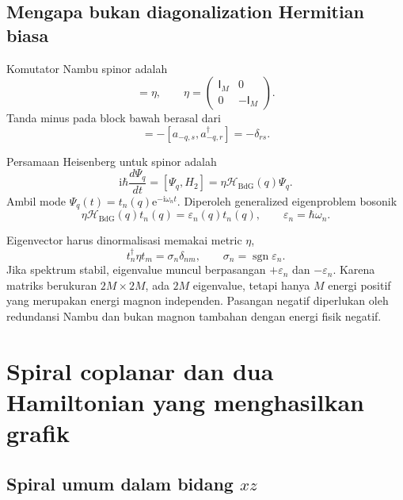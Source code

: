 \documentclass[11pt,a4paper]{article}
\newcommand{\ii}{\mathrm{i}}
\newcommand{\ee}{\mathrm{e}}
\newcommand{\mH}{\mathcal H}
\newcommand{\identity}{\mathsf I}
\begin{document}
\subsection{Mengapa bukan diagonalization Hermitian biasa}

Komutator Nambu spinor adalah
\begin{equation}
[\Psi_q,\Psi_q^\dagger]=
\eta,
\qquad
\eta=
\begin{pmatrix}
\identity_M&0\\0&-\identity_M
\end{pmatrix}.
\label{eq:bosonic-metric}
\end{equation}
Tanda minus pada block bawah berasal dari
\begin{equation}
[a_{-q,r}^\dagger,a_{-q,s}]=-[a_{-q,s},a_{-q,r}^\dagger]=-\delta_{rs}.
\end{equation}

Persamaan Heisenberg untuk spinor adalah
\begin{equation}
\ii\hbar\frac{d\Psi_q}{dt}
=[\Psi_q,H_2]
=\eta\mH_{\mathrm{BdG}}(q)\Psi_q.
\end{equation}
Ambil mode $\Psi_q(t)=t_n(q)\ee^{-\ii\omega_n t}$. Diperoleh generalized eigenproblem bosonik
\begin{equation}
\boxed{
\eta\mH_{\mathrm{BdG}}(q)t_n(q)
=\varepsilon_n(q)t_n(q),
\qquad
\varepsilon_n=\hbar\omega_n.}
\label{eq:bosonic-eigenproblem}
\end{equation}

Eigenvector harus dinormalisasi memakai metric $\eta$,
\begin{equation}
t_n^\dagger\eta t_m=\sigma_n\delta_{nm},
\qquad \sigma_n=\operatorname{sgn}\varepsilon_n.
\label{eq:paraunitary-normalization}
\end{equation}
Jika spektrum stabil, eigenvalue muncul berpasangan $+\varepsilon_n$ dan $-\varepsilon_n$. Karena matriks berukuran $2M\times2M$, ada $2M$ eigenvalue, tetapi hanya $M$ energi positif yang merupakan energi magnon independen. Pasangan negatif diperlukan oleh redundansi Nambu dan bukan magnon tambahan dengan energi fisik negatif.

\section{Spiral coplanar dan dua Hamiltonian yang menghasilkan grafik}

\subsection{Spiral umum dalam bidang \texorpdfstring{$xz$}{xz}}
\end{document}
